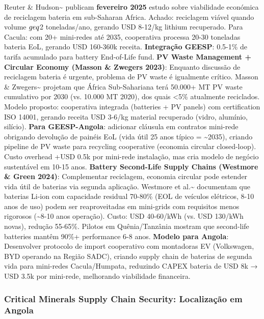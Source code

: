 \documentclass[12pt, a4paper]{article}
\begin{document}
Reuter \& Hudson\textasciitilde{}\citep{Reuter2025} publicam
\textbf{fevereiro 2025} estudo sobre viabilidade económica de reciclagem bateria em sub-Saharan Africa. Achado: reciclagem viável quando volume $\\geq$2 toneladas/ano, gerando USD 8-12/kg lithium recuperado. Para Cacula: com 20+ mini-redes até 2035, cooperativa processa 20-30 toneladas bateria EoL, gerando USD 160-360k receita.
\textbf{Integração GEESP}: 0.5-1\% de tarifa acumulado para battery End-of-Life fund.
\textbf{PV Waste Management + Circular Economy (Masson \& Zwegers 2023)}: Enquanto discussão de reciclagem bateria é urgente, problema de PV waste é igualmente crítico. Masson \& Zwegers\textasciitilde{}\citep{Masson2023} projetam que África Sub-Sahariana terá 50.000+ MT PV waste cumulativo por 2030 (vs. 10.000 MT 2020), dos quais <5\% atualmente reciclados. Modelo proposto: cooperativa integrada (batteries + PV panels) com certification ISO 14001, gerando receita USD 3-6/kg material recuperado (vidro, alumínio, silício).
\textbf{Para GEESP-Angola}: adicionar cláusula em contratos mini-rede obrigando devolução de painéis EoL (vida útil 25 anos típico = \textasciitilde{}2035), criando pipeline de PV waste para recycling cooperative (economia circular closed-loop). Custo overhead +USD 0.5k por mini-rede instalação, mas cria modelo de negócio sustentável em 10-15 anos.
\textbf{Battery Second-Life Supply Chains (Westmore \& Green 2024)}: Complementar reciclagem, economia circular pode estender vida útil de baterias via segunda aplicação. Westmore et al.\textasciitilde{}\citep{Westmore2024} documentam que baterias Li-ion com capacidade residual 70-80\% (EOL de veículos elétricos, 8-10 anos de uso) podem ser reaproveitadas em mini-grids com requisitos menos rigorosos (\textasciitilde{}8-10 anos operação). Custo: USD 40-60/kWh (vs. USD 130/kWh novas), redução 55-65\%. Pilotos em Quênia/Tanzânia mostram que second-life batteries mantêm 90\%+ performance 6-8 anos.
\textbf{Modelo para Angola}: Desenvolver protocolo de import cooperativo com montadoras EV (Volkswagen, BYD operando na Região SADC), criando supply chain de baterias de segunda vida para mini-redes Cacula/Humpata, reduzindo CAPEX bateria de USD 8k → USD 3.5k por mini-rede, melhorando viabilidade financeira.

\subsubsection{Critical Minerals Supply Chain Security: Localização em Angola}
\end{document}
